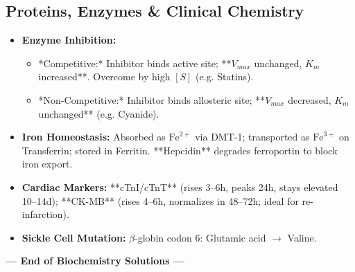 \documentclass[11pt,a4paper]{article}
\begin{document}
\subsection{Proteins, Enzymes \& Clinical Chemistry}
\begin{itemize}[leftmargin=*]
    \item \textbf{Enzyme Inhibition:}
    \begin{itemize}
        \item *Competitive:* Inhibitor binds active site; **$V_{max}$ unchanged, $K_m$ increased**. Overcome by high $[S]$ (e.g. Statins).
        \item *Non-Competitive:* Inhibitor binds allosteric site; **$V_{max}$ decreased, $K_m$ unchanged** (e.g. Cyanide).
    \end{itemize}
    \item \textbf{Iron Homeostasis:} Absorbed as $\text{Fe}^{2+}$ via DMT-1; transported as $\text{Fe}^{3+}$ on Transferrin; stored in Ferritin. **Hepcidin** degrades ferroportin to block iron export.
    \item \textbf{Cardiac Markers:} **cTnI/cTnT** (rises 3--6h, peaks 24h, stays elevated 10--14d); **CK-MB** (rises 4--6h, normalizes in 48--72h; ideal for re-infarction).
    \item \textbf{Sickle Cell Mutation:} $\beta$-globin codon 6: Glutamic acid $\rightarrow$ Valine.
\end{itemize}

\vspace{1cm}
\begin{center}
\textbf{--- End of Biochemistry Solutions ---}
\end{center}
\end{document}
